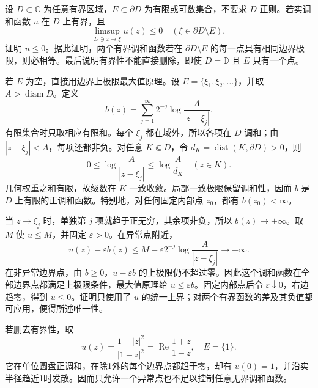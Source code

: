 \begin{exercise}[可数个边界异常点仍不破坏有界唯一性]\label{b3:ex:16-draft-08}
设 \(D\subset\mathbb C\) 为任意有界区域，\(E\subset\partial D\) 为有限或可数集合，不要求 \(D\) 正则。若实调和函数 \(u\) 在 \(D\) 上有界，且
\[
 \limsup_{D\ni z\to\xi}u(z)\le0
 \quad(\xi\in\partial D\setminus E),
\]
证明 \(u\le0\)。据此证明，两个有界调和函数若在 \(\partial D\setminus E\) 的每一点具有相同边界极限，则必相等。最后说明有界性不能直接删除，即使 \(D=\mathbb D\) 且 \(E\) 只有一个点。
\end{exercise}
\begin{solution}
若 \(E\) 为空，直接用边界上极限最大值原理。设 \(E=\{\xi_1,\xi_2,\ldots\}\)，并取 \(A>\operatorname{diam}D\)。定义
\[
 b(z)=\sum_{j=1}^\infty2^{-j}\log\frac A{|z-\xi_j|}.
\]
有限集合时只取相应有限和。每个 \(\xi_j\) 都在域外，所以各项在 \(D\) 调和；由 \(|z-\xi_j|<A\)，每项还都非负。对任意 \(K\Subset D\)，令 \(d_K=\operatorname{dist}(K,\partial D)>0\)，则
\[
 0\le\log\frac A{|z-\xi_j|}\le\log\frac A{d_K}
 \quad(z\in K).
\]
几何权重之和有限，故级数在 \(K\) 一致收敛。局部一致极限保留调和性，因而 \(b\) 是 \(D\) 上有限的正调和函数。特别地，对任何固定内部点 \(z_0\)，都有 \(b(z_0)<\infty\)。

当 \(z\to\xi_j\) 时，单独第 \(j\) 项就趋于正无穷，其余项非负，所以 \(b(z)\to+\infty\)。取 \(M\) 使 \(u\le M\)，并固定 \(\varepsilon>0\)。在异常点附近，
\[
 u(z)-\varepsilon b(z)
 \le M-\varepsilon2^{-j}\log\frac A{|z-\xi_j|}
 \longrightarrow-\infty.
\]
在非异常边界点，由 \(b\ge0\)，\(u-\varepsilon b\) 的上极限仍不超过零。因此这个调和函数在全部边界点都满足上极限条件，最大值原理给 \(u\le\varepsilon b\)。固定内部点后令 \(\varepsilon\downarrow0\)，右边趋零，得到 \(u\le0\)。证明只使用了 \(u\) 的统一上界；对两个有界函数的差及其负值都可应用，便得所述唯一性。

若删去有界性，取
\[
 u(z)=\frac{1-|z|^2}{|1-z|^2}
     =\operatorname{Re}\frac{1+z}{1-z},\quad E=\{1\}.
\]
它在单位圆盘正调和，在除1外的每个边界点都趋于零，却有 \(u(0)=1\)，并沿实半径趋近1时发散。因而只允许一个异常点也不足以控制任意无界调和函数。
\end{solution}
